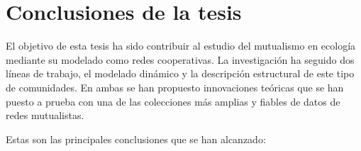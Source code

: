 
\chapter{Conclusiones de la tesis} %

\label{chapterCONCLUSIONES} %

El objetivo de esta tesis ha sido contribuir al estudio del mutualismo en ecología mediante su modelado como redes cooperativas. La investigación ha seguido dos líneas de trabajo, el modelado dinámico y la descripción estructural de este tipo de comunidades. En ambas se han propuesto innovaciones teóricas que se han puesto a prueba con una de las colecciones más amplias y fiables de datos de redes mutualistas.

Estas son las principales conclusiones que se han alcanzado:

